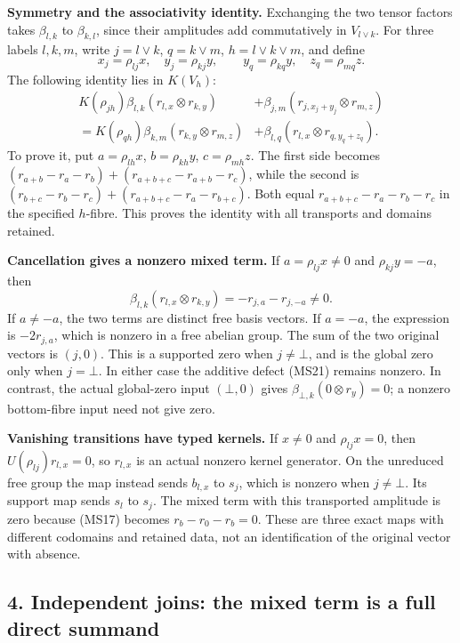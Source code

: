 \documentclass[
]{article}
\begin{document}
\textbf{Symmetry and the associativity identity.} Exchanging the two
tensor factors takes \(\beta_{l,k}\) to \(\beta_{k,l}\), since their
amplitudes add commutatively in \(V_{l\vee k}\). For three labels
\(l,k,m\), write \(j=l\vee k\), \(q=k\vee m\), \(h=l\vee k\vee m\), and
define \[
x_j=\rho_{lj}x,\quad y_j=\rho_{kj}y,\qquad
y_q=\rho_{kq}y,\quad z_q=\rho_{mq}z.
\] The following identity lies in \(K(V_h)\): \[
\begin{split}
K(\rho_{jh})\beta_{l,k}(r_{l,x}\otimes r_{k,y})
&+\beta_{j,m}(r_{j,x_j+y_j}\otimes r_{m,z})\\
=K(\rho_{qh})\beta_{k,m}(r_{k,y}\otimes r_{m,z})
&+\beta_{l,q}(r_{l,x}\otimes r_{q,y_q+z_q}).
\end{split}
\tag{MS20}
\] To prove it, put \(a=\rho_{lh}x\), \(b=\rho_{kh}y\),
\(c=\rho_{mh}z\). The first side becomes
\((r_{a+b}-r_a-r_b)+(r_{a+b+c}-r_{a+b}-r_c)\), while the second is
\((r_{b+c}-r_b-r_c)+(r_{a+b+c}-r_a-r_{b+c})\). Both equal
\(r_{a+b+c}-r_a-r_b-r_c\) in the specified \(h\)-fibre. This proves the
identity with all transports and domains retained.

\textbf{Cancellation gives a nonzero mixed term.} If
\(a=\rho_{lj}x\ne0\) and \(\rho_{kj}y=-a\), then \[
\beta_{l,k}(r_{l,x}\otimes r_{k,y})=-r_{j,a}-r_{j,-a}\ne0.
\tag{MS21}
\] If \(a\ne-a\), the two terms are distinct free basis vectors. If
\(a=-a\), the expression is \(-2r_{j,a}\), which is nonzero in a free
abelian group. The sum of the two original vectors is \((j,0)\). This is
a supported zero when \(j\ne\bot\), and is the global zero only when
\(j=\bot\). In either case the additive defect (MS21) remains nonzero.
In contrast, the actual global-zero input \((\bot,0)\) gives
\(\beta_{\bot,k}(0\otimes r_y)=0\); a nonzero bottom-fibre input need
not give zero.

\textbf{Vanishing transitions have typed kernels.} If \(x\ne0\) and
\(\rho_{lj}x=0\), then \(U(\rho_{lj})r_{l,x}=0\), so \(r_{l,x}\) is an
actual nonzero kernel generator. On the unreduced free group the map
instead sends \(b_{l,x}\) to \(s_j\), which is nonzero when
\(j\ne\bot\). Its support map sends \(s_l\) to \(s_j\). The mixed term
with this transported amplitude is zero because (MS17) becomes
\(r_b-r_0-r_b=0\). These are three exact maps with different codomains
and retained data, not an identification of the original vector with
absence.

\subsection{4. Independent joins: the mixed term is a full direct
summand}\label{independent-joins-the-mixed-term-is-a-full-direct-summand}
\end{document}
